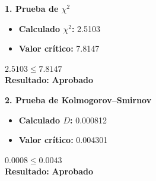 \noindent
\begin{minipage}[t]{0.48\textwidth}
    \textbf{1. Prueba de \(\chi^2\)}
    \vspace{0.3cm}
    \begin{itemize}[itemsep=0.4em]
        \item \textbf{Calculado \(\chi^2\):} 2.5103
        \item \textbf{Valor crítico:} 7.8147
    \end{itemize}

    \begin{center}
        \vspace{0.5cm}
        \(2.5103 \leq 7.8147\)
        \vspace{0.1cm}
        \\\textbf{Resultado: }
        \textcolor{green!60!black}{\textbf{Aprobado}}
    \end{center}

    \vspace{0.8cm}

    \textbf{2. Prueba de Kolmogorov--Smirnov}
    \vspace{0.3cm}
    \begin{itemize}[itemsep=0.4em]
        \item \textbf{Calculado \(D\):} 0.000812
        \item \textbf{Valor crítico:} 0.004301
    \end{itemize}
    \begin{center}
        \vspace{0.5cm}
        \(0.0008 \leq 0.0043\)
        \vspace{0.1cm}
        \\\textbf{Resultado: }
        \textcolor{green!60!black}{\textbf{Aprobado}}
    \end{center}

\end{minipage}
\hfill
